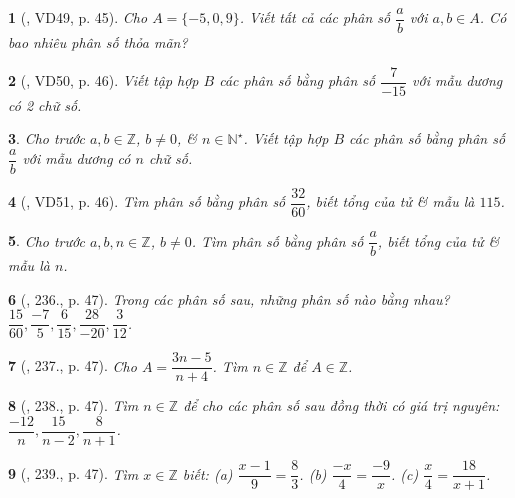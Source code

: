 \documentclass{article}
\newtheorem{baitoan}{}
\begin{document}
\begin{baitoan}[\cite{Tuyen_Toan_6}, VD49, p. 45]
	Cho $A = \{-5,0,9\}$. Viết tất cả các phân số $\dfrac{a}{b}$ với $a,b\in A$. Có bao nhiêu phân số thỏa mãn?
\end{baitoan}

\begin{baitoan}[\cite{Tuyen_Toan_6}, VD50, p. 46]
	Viết tập hợp $B$ các phân số bằng phân số $\dfrac{7}{-15}$ với mẫu dương có 2 chữ số.
\end{baitoan}

\begin{baitoan}
	Cho trước $a,b\in\mathbb{Z}$, $b\ne0$, \& $n\in\mathbb{N}^\star$. Viết tập hợp $B$ các phân số bằng phân số $\dfrac{a}{b}$ với mẫu dương có $n$ chữ số.
\end{baitoan}

\begin{baitoan}[\cite{Tuyen_Toan_6}, VD51, p. 46]
	Tìm phân số bằng phân số $\dfrac{32}{60}$, biết tổng của tử \& mẫu là $115$.
\end{baitoan}

\begin{baitoan}
	Cho trước $a,b,n\in\mathbb{Z}$, $b\ne0$. Tìm phân số bằng phân số $\dfrac{a}{b}$, biết tổng của tử \& mẫu là $n$.
\end{baitoan}

\begin{baitoan}[\cite{Tuyen_Toan_6}, 236., p. 47]
	Trong các phân số sau, những phân số nào bằng nhau? $\dfrac{15}{60},\dfrac{-7}{5},\dfrac{6}{15},\dfrac{28}{-20},\dfrac{3}{12}$.
\end{baitoan}

\begin{baitoan}[\cite{Tuyen_Toan_6}, 237., p. 47]
	Cho $A = \dfrac{3n - 5}{n + 4}$. Tìm $n\in\mathbb{Z}$ để $A\in\mathbb{Z}$.
\end{baitoan}

\begin{baitoan}[\cite{Tuyen_Toan_6}, 238., p. 47]
	Tìm $n\in\mathbb{Z}$ để cho các phân số sau đồng thời có giá trị nguyên: $\dfrac{-12}{n},\dfrac{15}{n - 2},\dfrac{8}{n + 1}$.
\end{baitoan}

\begin{baitoan}[\cite{Tuyen_Toan_6}, 239., p. 47]
	Tìm $x\in\mathbb{Z}$ biết: (a) $\dfrac{x - 1}{9} = \dfrac{8}{3}$. (b) $\dfrac{-x}{4} = \dfrac{-9}{x}$. (c) $\dfrac{x}{4} = \dfrac{18}{x + 1}$.
\end{baitoan}
\end{document}

